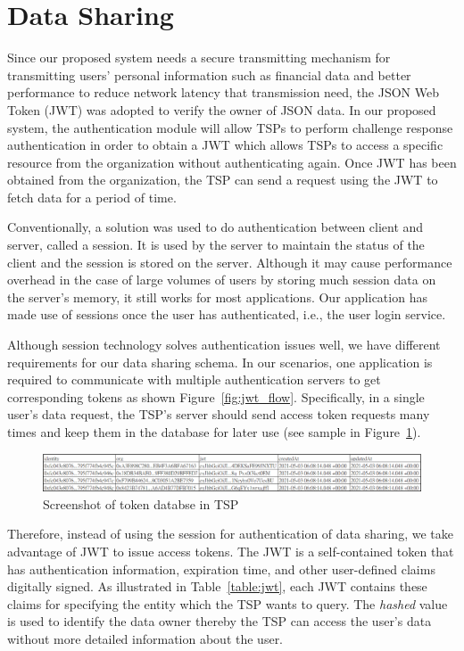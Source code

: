 \section{Data Sharing}
Since our proposed system needs a secure transmitting mechanism for transmitting users' personal information such as financial data and better performance to reduce network latency that transmission need, the JSON Web Token (JWT) was adopted to verify the owner of JSON data. In our proposed system, the authentication module will allow TSPs to perform challenge response authentication in order to obtain a JWT which allows TSPs to access a specific resource from the organization without authenticating again. Once JWT has been obtained from the organization, the TSP can send a request using the JWT to fetch data for a period of time.\par  
Conventionally, a solution was used to do authentication between client and server, called a session. It is used by the server to maintain the status of the client and the session is stored on the server. Although it may cause performance overhead in the case of large volumes of users by storing much session data on the server's memory, it still works for most applications. Our application has made use of sessions once the user has authenticated, i.e., the user login service.\par
Although session technology solves authentication issues well, we have different requirements for our data sharing schema. In our scenarios, one application is required to communicate with multiple authentication servers to get corresponding tokens as shown Figure~\ref{fig:jwt_flow}. Specifically, in a single user's data request, the TSP's server should send access token requests many times and keep them in the database for later use (see sample in Figure~\ref{fig:screenshot_database}). \par
\begin{figure}[htb]
    \centering
    \includegraphics[height=!,width=1\linewidth,keepaspectratio=true]{figures/screenshot_database.png}
    \caption{{\footnotesize Screenshot of token databse in TSP}}
    \label{fig:screenshot_database}
\end{figure}

Therefore, instead of using the session for authentication of data sharing, we take advantage of JWT to issue access tokens. The JWT is a self-contained token that has authentication information, expiration time, and other user-defined claims digitally signed. As illustrated in Table~\ref{table:jwt}, each JWT contains these claims for specifying the entity which the TSP wants to query. The \textit{hashed} value is used to identify the data owner thereby the TSP can access the user's data without more detailed information about the user.\par


